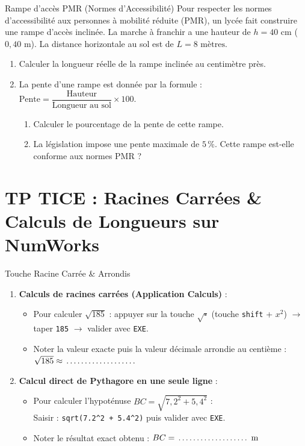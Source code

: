 \begin{exercice}[4 pts]{\capAnalyser}{Rampe d'accès PMR (Normes d'Accessibilité)}
Pour respecter les normes d'accessibilité aux personnes à mobilité réduite (PMR), un lycée fait construire une rampe d'accès inclinée.
La marche à franchir a une hauteur de $h = 40\text{ cm}$ ($0{,}40\text{ m}$).
La distance horizontale au sol est de $L = 8\text{ mètres}$.

\begin{enumerate}
    \item Calculer la longueur réelle de la rampe inclinée au centimètre près.
    \item La pente d'une rampe est donnée par la formule : $\text{Pente} = \dfrac{\text{Hauteur}}{\text{Longueur au sol}} \times 100$.
    \begin{enumerate}
        \item Calculer le pourcentage de la pente de cette rampe.
        \item La législation impose une pente maximale de $5\,\%$. Cette rampe est-elle conforme aux normes PMR ?
    \end{enumerate}
\end{enumerate}
\lignesreponse[5]
\end{exercice}

\section{TP TICE : Racines Carrées \& Calculs de Longueurs sur NumWorks}

\begin{tpinfo}{Touche Racine Carrée \& Arrondis}
\begin{enumerate}
    \item \textbf{Calculs de racines carrées (Application Calculs)} :
    \begin{itemize}
        \item Pour calculer $\sqrt{185}$ : appuyer sur la touche \texttt{$\sqrt{\square}$} (touche \texttt{shift} + \texttt{$x^2$}) $\rightarrow$ taper \texttt{185} $\rightarrow$ valider avec \texttt{EXE}.
        \item Noter la valeur exacte puis la valeur décimale arrondie au centième : $\sqrt{185} \approx \pointille[3cm]$
    \end{itemize}
    \item \textbf{Calcul direct de Pythagore en une seule ligne} :
    \begin{itemize}
        \item Pour calculer l'hypoténuse $BC = \sqrt{7{,}2^2 + 5{,}4^2}$ :\\
        Saisir : \texttt{sqrt(7.2\^{}2 + 5.4\^{}2)} puis valider avec \texttt{EXE}.
        \item Noter le résultat exact obtenu : $BC = \pointille[3cm]\text{ m}$
    \end{itemize}
\end{enumerate}
\end{tpinfo}

